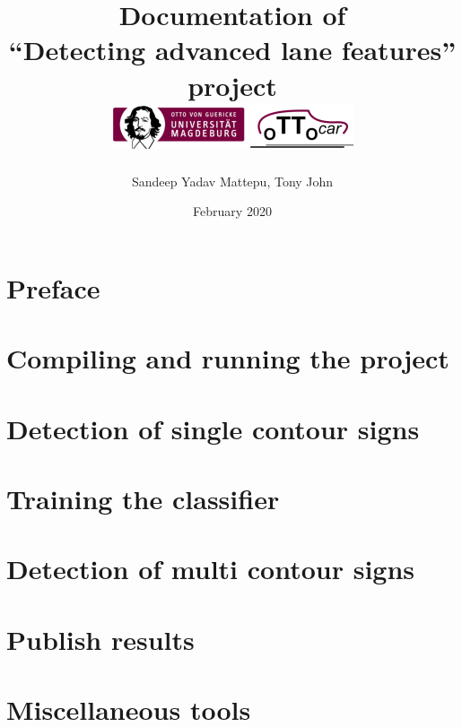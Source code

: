 \documentclass[12pt, a4paper]{report}
\title{{Documentation of \\\textbf{``Detecting advanced lane features''} \\project}\\
\vspace{1cm}
{\includegraphics{ottocar.png}}}
\author{Sandeep Yadav Mattepu, Tony John}
\date{February 2020}
\begin{document}
\maketitle
\listoffigures
\tableofcontents

\chapter*{Preface}


\chapter{Compiling and running the project}


\chapter{Detection of single contour signs}


\chapter{Training the classifier}
\label{chap:TrainingClassifier}


\chapter{Detection of multi contour signs}
\label{chap:MultiContour}


\chapter{Publish results}
\label{chap:PublishResults}


\chapter{Miscellaneous tools}

\end{document}
